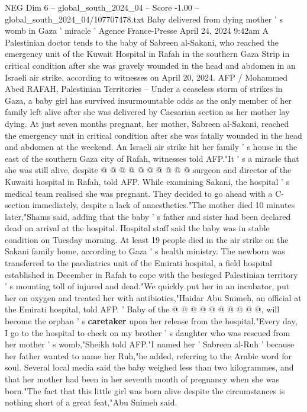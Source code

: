 \begin{textsample}{NEG Dim 6 – global\_south\_2024\_04 – Score -1.00 – global\_south\_2024\_04/107707478.txt}  \label{ex:f6_neg_329}
Baby delivered from dying mother ' s womb in Gaza ' miracle ' Agence France-Presse April 24, 2024 9:42am A Palestinian doctor tends to the baby of Sabreen al-Sakani, who reached the emergency unit of the Kuwait Hospital in Rafah in the southern Gaza Strip in critical condition after she was gravely wounded in the head and abdomen in an Israeli air strike, according to witnesses on April 20, 2024.
AFP / Mohammed Abed RAFAH, Palestinian Territories -- Under a ceaseless storm of strikes in Gaza, a baby girl has survived insurmountable odds as the only member of her family left alive after she was delivered by Caesarian section as her mother lay dying.
At just seven months pregnant, her mother, Sabreen al-Sakani, reached the emergency unit in critical condition after she was fatally wounded in the head and abdomen at the weekend.
An Israeli air strike hit her family ' s house in the east of the southern Gaza city of Rafah, witnesses told AFP."It ' s a miracle that she was still alive, despite @ @ @ @ @ @ @ @ @ @ surgeon and director of the Kuwaiti hospital in Rafah, told AFP.
While examining Sakani, the hospital ' s medical team realised she was pregnant.
They decided to go ahead with a C-section immediately, despite a lack of anaesthetics."The mother died 10 minutes later,"Shams said, adding that the baby ' s father and sister had been declared dead on arrival at the hospital.
Hospital staff said the baby was in stable condition on Tuesday morning.
At least 19 people died in the air strike on the Sakani family home, according to Gaza ' s health ministry.
The newborn was transferred to the paediatrics unit of the Emirati hospital, a field hospital established in December in Rafah to cope with the besieged Palestinian territory ' s mounting toll of injured and dead."We quickly put her in an incubator, put her on oxygen and treated her with antibiotics,"Haidar Abu Snimeh, an official at the Emirati hospital, told AFP. ' Baby of the @ @ @ @ @ @ @ @ @ @, will become the orphan ' s \textbf{caretaker} upon her release from the hospital."Every day, I go to the hospital to check on my brother ' s daughter who was rescued from her mother ' s womb,"Sheikh told AFP."I named her ' Sabreen al-Ruh ' because her father wanted to name her Ruh,"he added, referring to the Arabic word for soul.
Several local media said the baby weighed less than two kilogrammes, and that her mother had been in her seventh month of pregnancy when she was born."The fact that this little girl was born alive despite the circumstances is nothing short of a great feat,"Abu Snimeh said.

\end{textsample}

